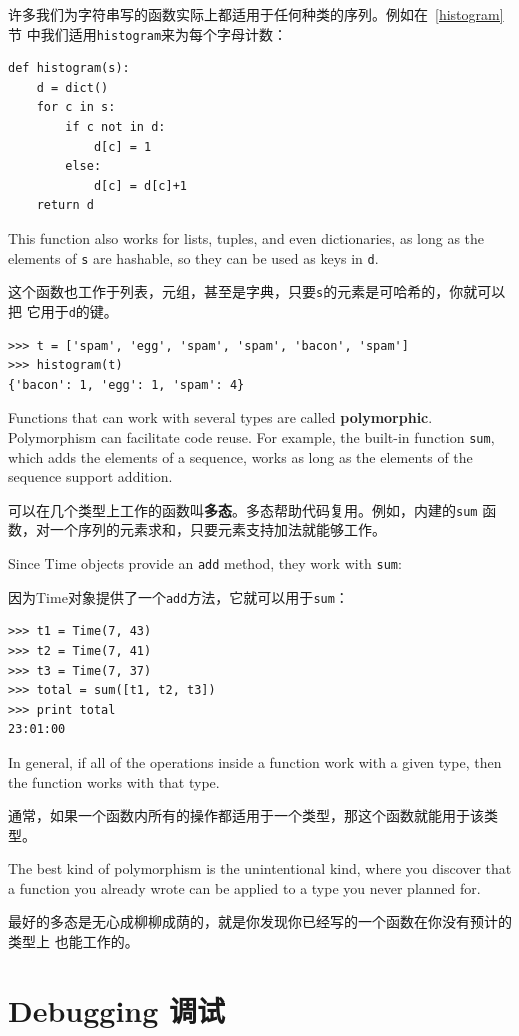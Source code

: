 \documentclass[10pt]{book}
\begin{document}
\begin{CJK}{UTF8}{gbsn}
许多我们为字符串写的函数实际上都适用于任何种类的序列。例如在~\ref{histogram}节
中我们适用{\tt histogram}来为每个字母计数：

\begin{verbatim}
def histogram(s):
    d = dict()
    for c in s:
        if c not in d:
            d[c] = 1
        else:
            d[c] = d[c]+1
    return d
\end{verbatim}
%
This function also works for lists, tuples, and even dictionaries,
as long as the elements of {\tt s} are hashable, so they can be used
as keys in {\tt d}.

这个函数也工作于列表，元组，甚至是字典，只要{\tt s}的元素是可哈希的，你就可以把
它用于{\tt d}的键。

\begin{verbatim}
>>> t = ['spam', 'egg', 'spam', 'spam', 'bacon', 'spam']
>>> histogram(t)
{'bacon': 1, 'egg': 1, 'spam': 4}
\end{verbatim}
%
Functions that can work with several types are called {\bf polymorphic}.
Polymorphism can facilitate code reuse.  For example, the built-in
function {\tt sum}, which adds the elements of a sequence, works
as long as the elements of the sequence support addition.

可以在几个类型上工作的函数叫{\bf 多态}。多态帮助代码复用。例如，内建的{\tt sum}
函数，对一个序列的元素求和，只要元素支持加法就能够工作。

Since Time objects provide an {\tt add} method, they work
with {\tt sum}:

因为Time对象提供了一个{\tt add}方法，它就可以用于{\tt sum}：

\begin{verbatim}
>>> t1 = Time(7, 43)
>>> t2 = Time(7, 41)
>>> t3 = Time(7, 37)
>>> total = sum([t1, t2, t3])
>>> print total
23:01:00
\end{verbatim}
%
In general, if all of the operations inside a function 
work with a given type, then the function works with that type.

通常，如果一个函数内所有的操作都适用于一个类型，那这个函数就能用于该类型。

The best kind of polymorphism is the unintentional kind, where
you discover that a function you already wrote can be
applied to a type you never planned for.

最好的多态是无心成柳柳成荫的，就是你发现你已经写的一个函数在你没有预计的类型上
也能工作的。


\section{Debugging 调试}


\end{CJK}
\end{document}

